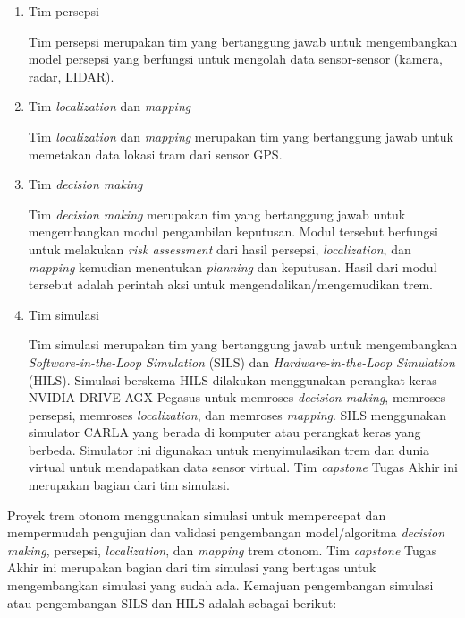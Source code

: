 \begin{enumerate}

    \item Tim persepsi

    Tim persepsi merupakan tim yang bertanggung jawab untuk mengembangkan model
    persepsi yang berfungsi untuk mengolah data sensor-sensor (kamera, radar,
    LIDAR).

    \item Tim \textit{localization} dan \textit{mapping}

    Tim \textit{localization} dan \textit{mapping} merupakan tim yang
    bertanggung jawab untuk memetakan data lokasi tram dari sensor GPS.

    \item Tim \textit{decision making}

    Tim \textit{decision making} merupakan tim yang bertanggung jawab untuk
    mengembangkan modul pengambilan keputusan. Modul tersebut berfungsi untuk
    melakukan \textit{risk assessment} dari hasil persepsi,
    \textit{localization}, dan \textit{mapping} kemudian menentukan
    \textit{planning} dan keputusan. Hasil dari modul tersebut adalah perintah
    aksi untuk mengendalikan/mengemudikan trem.

    \item Tim simulasi

    Tim simulasi merupakan tim yang bertanggung jawab untuk mengembangkan
    \textit{Software-in-the-Loop Simulation} (SILS) dan
    \textit{Hardware-in-the-Loop Simulation} (HILS). Simulasi berskema HILS
    dilakukan menggunakan perangkat keras NVIDIA DRIVE AGX Pegasus untuk
    memroses \textit{decision making}, memroses persepsi, memroses
    \textit{localization}, dan memroses \textit{mapping}. SILS menggunakan
    simulator CARLA yang berada di komputer atau perangkat keras yang berbeda.
    Simulator ini digunakan untuk menyimulasikan trem dan dunia virtual untuk
    mendapatkan data sensor virtual. Tim \textit{capstone} Tugas Akhir ini
    merupakan bagian dari tim simulasi.

\end{enumerate}

Proyek trem otonom menggunakan simulasi untuk mempercepat dan mempermudah
pengujian dan validasi pengembangan model/algoritma \textit{decision making},
persepsi, \textit{localization}, dan \textit{mapping} trem otonom. Tim
\textit{capstone} Tugas Akhir ini merupakan bagian dari tim simulasi yang
bertugas untuk mengembangkan simulasi yang sudah ada. Kemajuan
pengembangan simulasi atau pengembangan SILS dan HILS adalah sebagai berikut:

